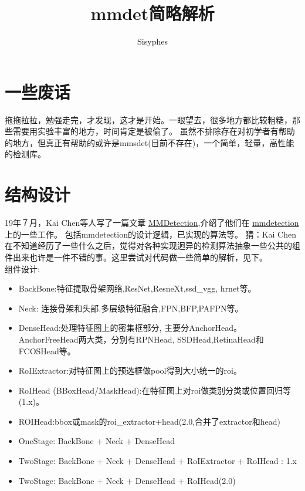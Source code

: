\documentclass[UTF8]{ctexart}
\title{mmdet简略解析}
\author{Sisyphes}
\begin{document}
\maketitle
\tableofcontents
\newpage



\section{一些废话}
拖拖拉拉，勉强走完，才发现，这才是开始。一眼望去，很多地方都比较粗糙，那些需要用实验丰富的地方，时间肯定是被偷了。
虽然不排除存在对初学者有帮助的地方，但真正有帮助的或许是mmsdet(目前不存在)，一个简单，轻量，高性能的检测库。

\section{结构设计}
 
 19年７月，Kai Chen等人写了一篇文章
 \href{https://arxiv.org/pdf/1906.07155.pdf}{MMDetection},介绍了他们在
 \href{https://github.com/open-mmlab/mmdetection}{mmdetection}上的一些工作。
  包括mmdetection的设计逻辑，已实现的算法等。
  猜：Kai Chen在不知道经历了一些什么之后，觉得对各种实现迥异的检测算法抽象一些公共的组件出来也许是一件不错的事。这里尝试对代码做一些简单的解析，见下。
  \\
  
  \noindent 组件设计:
  \begin{itemize}
 	\item BackBone:特征提取骨架网络,ResNet,ResneXt,ssd\_vgg, hrnet等。
	\item Neck: 连接骨架和头部.多层级特征融合,FPN,BFP,PAFPN等。
	\item DenseHead:处理特征图上的密集框部分, 主要分AnchorHead。 AnchorFreeHead两大类，分别有RPNHead, SSDHead,RetinaHead和FCOSHead等。
 	\item RoIExtractor:对特征图上的预选框做pool得到大小统一的roi。
	\item RoIHead (BBoxHead/MaskHead):在特征图上对roi做类别分类或位置回归等(1.x)。
	\item ROIHead:bbox或mask的roi\_extractor+head(2.0,合并了extractor和head)
	\item OneStage: BackBone + Neck + DenseHead
 	\item TwoStage: BackBone + Neck  + DenseHead + RoIExtractor + RoIHead : 1.x
 	\item TwoStage: BackBone + Neck  + DenseHead + RoIHead(2.0)
 	
 \end{itemize}
 
\end{document}
